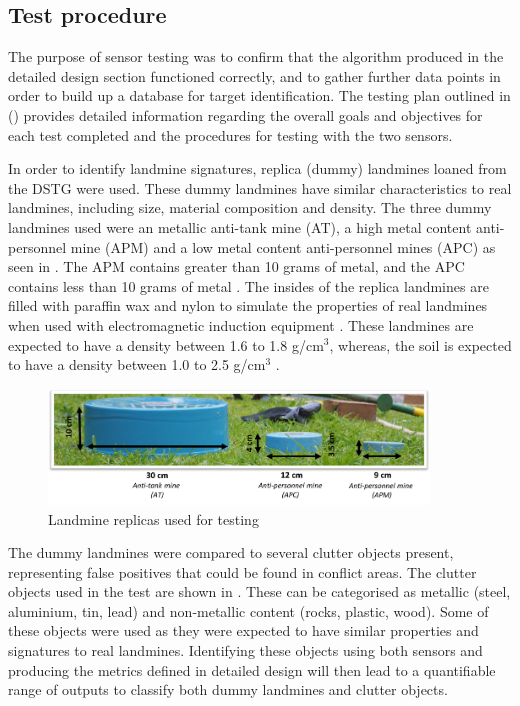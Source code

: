 \documentclass[main.tex]{subfiles}
\begin{document}
\subsection{Test procedure}
The purpose of sensor testing was to confirm that the algorithm produced in the detailed design section functioned correctly, and to gather further data points in order to build up a database for target identification. The testing plan outlined in () provides detailed information regarding the overall goals and objectives for each test completed and the procedures for testing with the two sensors. 

In order to identify landmine signatures, replica (dummy) landmines loaned from the DSTG were used. These dummy landmines have similar characteristics to real landmines, including size, material composition and density. The three dummy landmines used were an metallic anti-tank mine (AT), a high metal content anti-personnel mine (APM) and a low metal content anti-personnel mines (APC) as seen in . The APM contains greater than 10 grams of metal, and the APC contains less than 10 grams of metal \parencite{chant2005dsto}. The insides of the replica landmines are filled with paraffin wax and nylon to simulate the properties of real landmines when used with electromagnetic induction equipment \parencite{chant2005dsto}. These landmines are expected to have a density between 1.6 to 1.8 g/cm$^3$, whereas, the soil is expected to have a density between 1.0 to 2.5 g/cm$^3$ \parencite{das2002soil}.		
\begin{figure}[ht]
\includegraphics[width=0.9\textwidth]{5-Testing/dummy.PNG}
\centering
\caption{Landmine replicas used for testing }
\end{figure}

The dummy landmines were compared to several clutter objects present, representing false positives that could be found in conflict areas. The clutter objects used in the test are shown in . These can be categorised as metallic (steel, aluminium, tin, lead) and non-metallic content (rocks, plastic, wood). Some of these objects were used as they were expected to have similar properties and signatures to real landmines. Identifying these objects using both sensors and producing the metrics defined in detailed design will then lead to a quantifiable range of outputs to classify both dummy landmines and clutter objects.
\end{document}
